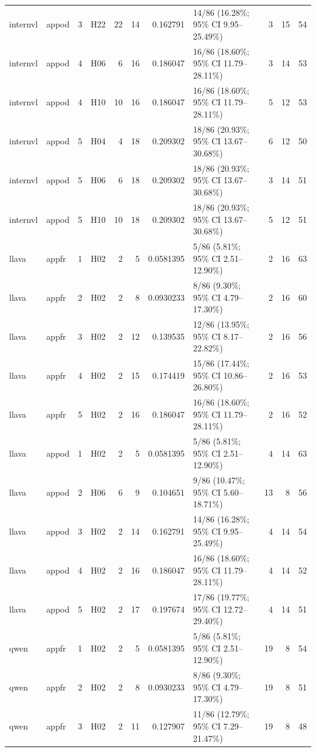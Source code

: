 \begin{table}[tbp]
\begin{tabular}{llrlrrrlrrr}
internvl & appod & 3 & H22 & 22 & 14 & 0.162791 & 14/86 (16.28\%; 95\% CI 9.95–25.49\%) & 3 & 15 & 54 \\
internvl & appod & 4 & H06 & 6 & 16 & 0.186047 & 16/86 (18.60\%; 95\% CI 11.79–28.11\%) & 3 & 14 & 53 \\
internvl & appod & 4 & H10 & 10 & 16 & 0.186047 & 16/86 (18.60\%; 95\% CI 11.79–28.11\%) & 5 & 12 & 53 \\
internvl & appod & 5 & H04 & 4 & 18 & 0.209302 & 18/86 (20.93\%; 95\% CI 13.67–30.68\%) & 6 & 12 & 50 \\
internvl & appod & 5 & H06 & 6 & 18 & 0.209302 & 18/86 (20.93\%; 95\% CI 13.67–30.68\%) & 3 & 14 & 51 \\
internvl & appod & 5 & H10 & 10 & 18 & 0.209302 & 18/86 (20.93\%; 95\% CI 13.67–30.68\%) & 5 & 12 & 51 \\
llava & appfr & 1 & H02 & 2 & 5 & 0.0581395 & 5/86 (5.81\%; 95\% CI 2.51–12.90\%) & 2 & 16 & 63 \\
llava & appfr & 2 & H02 & 2 & 8 & 0.0930233 & 8/86 (9.30\%; 95\% CI 4.79–17.30\%) & 2 & 16 & 60 \\
llava & appfr & 3 & H02 & 2 & 12 & 0.139535 & 12/86 (13.95\%; 95\% CI 8.17–22.82\%) & 2 & 16 & 56 \\
llava & appfr & 4 & H02 & 2 & 15 & 0.174419 & 15/86 (17.44\%; 95\% CI 10.86–26.80\%) & 2 & 16 & 53 \\
llava & appfr & 5 & H02 & 2 & 16 & 0.186047 & 16/86 (18.60\%; 95\% CI 11.79–28.11\%) & 2 & 16 & 52 \\
llava & appod & 1 & H02 & 2 & 5 & 0.0581395 & 5/86 (5.81\%; 95\% CI 2.51–12.90\%) & 4 & 14 & 63 \\
llava & appod & 2 & H06 & 6 & 9 & 0.104651 & 9/86 (10.47\%; 95\% CI 5.60–18.71\%) & 13 & 8 & 56 \\
llava & appod & 3 & H02 & 2 & 14 & 0.162791 & 14/86 (16.28\%; 95\% CI 9.95–25.49\%) & 4 & 14 & 54 \\
llava & appod & 4 & H02 & 2 & 16 & 0.186047 & 16/86 (18.60\%; 95\% CI 11.79–28.11\%) & 4 & 14 & 52 \\
llava & appod & 5 & H02 & 2 & 17 & 0.197674 & 17/86 (19.77\%; 95\% CI 12.72–29.40\%) & 4 & 14 & 51 \\
qwen & appfr & 1 & H02 & 2 & 5 & 0.0581395 & 5/86 (5.81\%; 95\% CI 2.51–12.90\%) & 19 & 8 & 54 \\
qwen & appfr & 2 & H02 & 2 & 8 & 0.0930233 & 8/86 (9.30\%; 95\% CI 4.79–17.30\%) & 19 & 8 & 51 \\
qwen & appfr & 3 & H02 & 2 & 11 & 0.127907 & 11/86 (12.79\%; 95\% CI 7.29–21.47\%) & 19 & 8 & 48 \\

\end{tabular}
\end{table}
